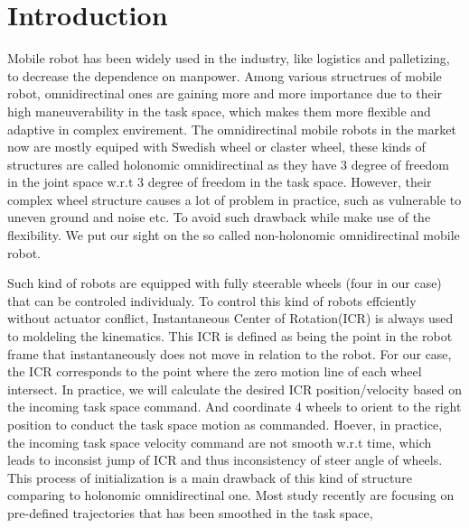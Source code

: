 \chapter{Introduction}
\label{cha:introduction}

Mobile robot has been widely used in the industry, like logistics and palletizing, to decrease the dependence on manpower. Among various structrues of mobile robot, omnidirectinal ones are gaining more and more 
importance due to their high maneuverability in the task space, which makes them more flexible and adaptive in complex envirement. The omnidirectinal mobile robots in the market now are mostly equiped with 
Swedish wheel or claster wheel, these kinds of structures are called holonomic omnidirectinal as they have 3 degree of freedom in the joint space w.r.t 3 degree of freedom in the task space. However, their complex 
wheel structure causes a lot of problem in practice, such as vulnerable to uneven ground and noise etc. To avoid such drawback while make use of the flexibility. We put our sight on the so called non-holonomic 
omnidirectinal mobile robot. 

Such kind of robots are equipped with fully steerable wheels (four in our case) that can be controled individualy. To control this kind of robots effciently without actuator conflict, Instantaneous Center of 
Rotation(ICR) is always used to moldeling the kinematics. This ICR is defined as being the point in the robot frame that instantaneously does not move in relation to the robot. For our case, the ICR 
corresponds to the point where the zero motion line of each wheel intersect. In practice, we will calculate the desired ICR position/velocity based on the incoming task space command. And coordinate 4 wheels to 
orient to the right position to conduct the task space motion as commanded. Hoever, in practice, the incoming task space velocity command are not smooth w.r.t time, which leads to inconsist jump of ICR and thus
inconsistency of steer angle of wheels. This process of initialization is a main drawback of this kind of structure comparing to holonomic omnidirectinal one. Most study recently are focusing on pre-defined 
trajectories that has been smoothed in the task space\cite{dietrich2011singularity},


